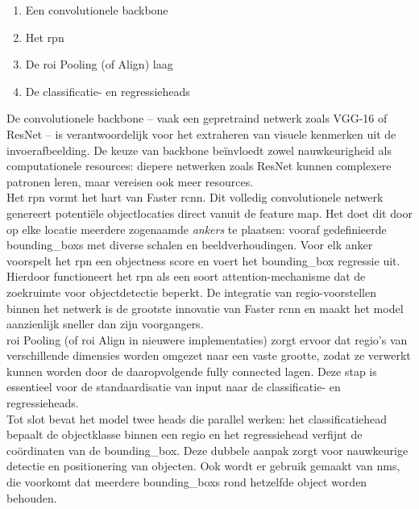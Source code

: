 \begin{enumerate}
    \item Een convolutionele backbone
    \item Het \gls{rpn}
    \item De \gls{roi} Pooling (of Align) laag
    \item De classificatie- en regressieheads
\end{enumerate}

De convolutionele backbone -- vaak een gepretraind netwerk zoals VGG-16 of ResNet -- is verantwoordelijk voor het extraheren van visuele kenmerken uit de invoerafbeelding. De keuze van backbone beïnvloedt zowel nauwkeurigheid als computationele resources: diepere netwerken zoals ResNet kunnen complexere patronen leren, maar vereisen ook meer resources. \\

Het \gls{rpn} vormt het hart van Faster \gls{rcnn}. Dit volledig convolutionele netwerk genereert potentiële objectlocaties direct vanuit de feature map. Het doet dit door op elke locatie meerdere zogenaamde \emph{ankers} te plaatsen: vooraf gedefinieerde \glspl{bounding_box} met diverse schalen en beeldverhoudingen. Voor elk anker voorspelt het \gls{rpn} een objectness score en voert het \gls{bounding_box} regressie uit. Hierdoor functioneert het \gls{rpn} als een soort attention-mechanisme dat de zoekruimte voor objectdetectie beperkt. De integratie van regio-voorstellen binnen het netwerk is de grootste innovatie van Faster \gls{rcnn} en maakt het model aanzienlijk sneller dan zijn voorgangers. \\

\gls{roi} Pooling (of \gls{roi} Align in nieuwere implementaties) zorgt ervoor dat regio’s van verschillende dimensies worden omgezet naar een vaste grootte, zodat ze verwerkt kunnen worden door de daaropvolgende fully connected lagen. Deze stap is essentieel voor de standaardisatie van input naar de classificatie- en regressieheads. \\

Tot slot bevat het model twee heads die parallel werken: het classificatiehead bepaalt de objectklasse binnen een regio en het regressiehead verfijnt de coördinaten van de \gls{bounding_box}. Deze dubbele aanpak zorgt voor nauwkeurige detectie en positionering van objecten. Ook wordt er gebruik gemaakt van \gls{nms}, die voorkomt dat meerdere \glspl{bounding_box} rond hetzelfde object worden behouden. \\

